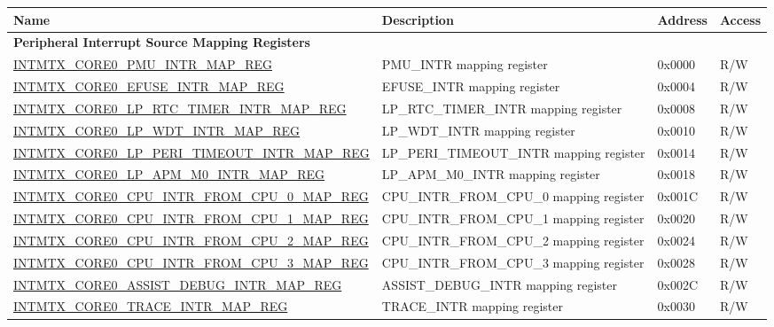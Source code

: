 \begin{longtable}{ | p{10cm} | p{10cm} | p{1.3cm} | p{1cm} | }
\hline\rowcolor{lightgray}
\textbf{Name} & \textbf{Description} &  \textbf{Address} & \textbf{Access} \\ \hline
\endhead
\multicolumn{4}{|l|}{\textbf{Peripheral Interrupt Source Mapping Registers}} \\ \hline
\hyperref[regdesc:INTMTXCORE0PMUINTRMAPREG]{INTMTX\_CORE0\_PMU\_INTR\_MAP\_REG} & PMU\_INTR mapping register & 0x0000 & R/W \\ \hline
\hyperref[regdesc:INTMTXCORE0EFUSEINTRMAPREG]{INTMTX\_CORE0\_EFUSE\_INTR\_MAP\_REG} & EFUSE\_INTR mapping register & 0x0004 & R/W \\ \hline
\hyperref[regdesc:INTMTXCORE0LPRTCTIMERINTRMAPREG]{INTMTX\_CORE0\_LP\_RTC\_TIMER\_INTR\_MAP\_REG} & LP\_RTC\_TIMER\_INTR mapping register & 0x0008 & R/W \\ \hline
\hyperref[regdesc:INTMTXCORE0LPWDTINTRMAPREG]{INTMTX\_CORE0\_LP\_WDT\_INTR\_MAP\_REG} & LP\_WDT\_INTR mapping register & 0x0010 & R/W \\ \hline
\hyperref[regdesc:INTMTXCORE0LPPERITIMEOUTINTRMAPREG]{INTMTX\_CORE0\_LP\_PERI\_TIMEOUT\_INTR\_MAP\_REG} & LP\_PERI\_TIMEOUT\_INTR mapping register & 0x0014 & R/W \\ \hline
\hyperref[regdesc:INTMTXCORE0LPAPMM0INTRMAPREG]{INTMTX\_CORE0\_LP\_APM\_M0\_INTR\_MAP\_REG} & LP\_APM\_M0\_INTR mapping register & 0x0018 & R/W \\ \hline
\hyperref[regdesc:INTMTXCORE0CPUINTRFROMCPU0MAPREG]{INTMTX\_CORE0\_CPU\_INTR\_FROM\_CPU\_0\_MAP\_REG} & CPU\_INTR\_FROM\_CPU\_0 mapping register & 0x001C & R/W \\ \hline
\hyperref[regdesc:INTMTXCORE0CPUINTRFROMCPU1MAPREG]{INTMTX\_CORE0\_CPU\_INTR\_FROM\_CPU\_1\_MAP\_REG} & CPU\_INTR\_FROM\_CPU\_1 mapping register & 0x0020 & R/W \\ \hline
\hyperref[regdesc:INTMTXCORE0CPUINTRFROMCPU2MAPREG]{INTMTX\_CORE0\_CPU\_INTR\_FROM\_CPU\_2\_MAP\_REG} & CPU\_INTR\_FROM\_CPU\_2 mapping register & 0x0024 & R/W \\ \hline
\hyperref[regdesc:INTMTXCORE0CPUINTRFROMCPU3MAPREG]{INTMTX\_CORE0\_CPU\_INTR\_FROM\_CPU\_3\_MAP\_REG} & CPU\_INTR\_FROM\_CPU\_3 mapping register & 0x0028 & R/W \\ \hline
\hyperref[regdesc:INTMTXCORE0ASSISTDEBUGINTRMAPREG]{INTMTX\_CORE0\_ASSIST\_DEBUG\_INTR\_MAP\_REG} & ASSIST\_DEBUG\_INTR mapping register & 0x002C & R/W \\ \hline
\hyperref[regdesc:INTMTXCORE0TRACEINTRMAPREG]{INTMTX\_CORE0\_TRACE\_INTR\_MAP\_REG} & TRACE\_INTR mapping register & 0x0030 & R/W \\ \hline

\end{longtable}
